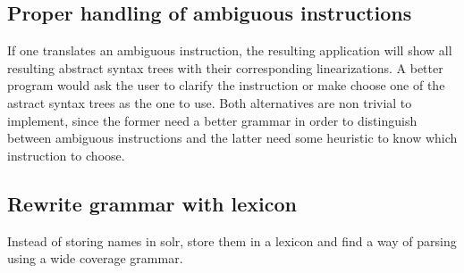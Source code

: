 \subsection*{Proper handling of ambiguous instructions}
If one translates an ambiguous instruction, the resulting application will show all resulting abstract syntax trees with their corresponding linearizations. A better program would ask the user to clarify the instruction or make choose one of the astract syntax trees as the one to use. Both alternatives are non trivial to implement, since the former need a better grammar in order to distinguish between ambiguous instructions and the latter need some heuristic to know which instruction to choose.

\subsection*{Rewrite grammar with lexicon}
Instead of storing names in solr, store them in a lexicon and find a way of parsing using a wide coverage grammar.